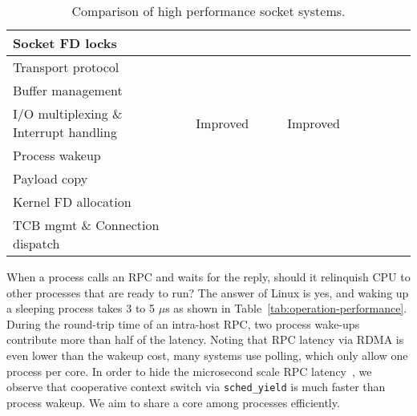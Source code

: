 \begin{table*}[t]
{\begin{tabularx}{1.45\textwidth}{l|X|X|X|X|X|X|X|X|X|X|}
			\hline
			Socket FD locks & & & & & & & & & & \yes \\
			\hline
			Transport protocol & & & & & & & & \yes & \yes & \yes \\
			\hline
			Buffer management & & & & & & & & & & \yes \\
			\hline
			I/O multiplexing \& Interrupt handling & & Improved & \yes & \yes & Improved & \yes & \yes & \yes & \yes & \yes \\
			\hline
			Process wakeup & & & & & & & & & & \yes \\
			\hline
			Payload copy & & \yes & & & \yes & & & & & \yes \\
			\hline
			Kernel FD allocation & & \yes &  &  & \yes & & & & & \yes \\
			\hline
			TCB mgmt \& Connection dispatch & \yes & \yes & \yes & \yes & \yes & & & & & \yes \\
			\hline
		\end{tabularx}
	}
	\caption{Comparison of high performance socket systems.}
	\label{tab:related-work}
	\vspace{-20pt}
\end{table*}




When a process calls an RPC and waits for the reply, should it relinquish CPU to other processes that are ready to run?
The answer of Linux is yes, and waking up a sleeping process takes 3 to 5 $\mu$s as shown in Table~\ref{tab:operation-performance}.
During the round-trip time of an intra-host RPC, two process wake-ups contribute more than half of the latency.
Noting that RPC latency via RDMA is even lower than the wakeup cost, many systems use polling, which only allow one process per core.
In order to hide the microsecond scale RPC latency~\cite{barroso2017attack}, we observe that cooperative context switch via \texttt{sched\_yield} is much faster than process wakeup.
We aim to share a core among processes efficiently.



